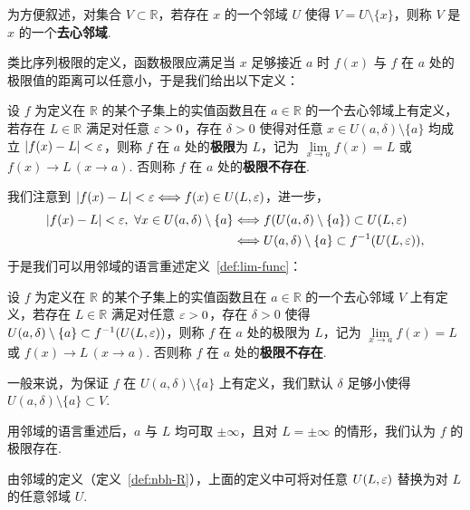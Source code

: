 \documentclass[../main.tex]{subfiles}
\begin{document}
为方便叙述，对集合 $V \subset \mathbb R$，若存在 $x$ 的一个邻域 $U$ 使得 $V = U \setminus \{x\}$，则称 $V$ 是 $x$ 的一个\textbf{去心邻域}. 

类比序列极限的定义，函数极限应满足当 $x$ 足够接近 $a$ 时 $f(x)$ 与 $f$ 在 $a$ 处的极限值的距离可以任意小，于是我们给出以下定义：

\begin{definition}[函数极限的算术化定义] \label{def:lim-func}
    设 $f$ 为定义在 $\mathbb R$ 的某个子集上的实值函数且在 $a \in \mathbb R$ 的一个去心邻域上有定义，若存在 $L \in \mathbb R$ 满足对任意 $\varepsilon > 0$，存在 $\delta > 0$ 使得对任意 $x \in U(a, \delta) \setminus \{a\}$ 均成立 $|f(x) - L| < \varepsilon$，则称 $f$ 在 $a$ 处的\textbf{极限}为 $L$，记为 $\lim\limits_{x \to a} f(x) = L$ 或 $f(x) \to L \,(x \to a)$. 否则称 $f$ 在 $a$ 处的\textbf{极限不存在}. 
\end{definition}

我们注意到 $|f(x) - L| < \varepsilon \Longleftrightarrow f(x) \in U(L, \varepsilon)$，进一步，
\begin{align*}
    |f(x) - L| < \varepsilon, \ \forall x \in U(a, \delta) \setminus \{a\} 
&\Longleftrightarrow f(U(a, \delta) \setminus \{a\}) \subset U(L, \varepsilon) \\
&\Longleftrightarrow U(a, \delta) \setminus \{a\} \subset f^{-1}(U(L, \varepsilon)), 
\end{align*}
于是我们可以用邻域的语言重述定义~\ref{def:lim-func}：

\begin{definition} \label{def:lim-func-nbh}
    设 $f$ 为定义在 $\mathbb R$ 的某个子集上的实值函数且在 $a \in \mathbb R$ 的一个去心邻域 $V$ 上有定义，若存在 $L \in \mathbb R$ 满足对任意 $\varepsilon > 0$，存在 $\delta > 0$ 使得 $U(a, \delta) \setminus \{a\} \subset f^{-1}(U(L, \varepsilon))$，则称 $f$ 在 $a$ 处的极限为 $L$，记为 $\lim\limits_{x \to a} f(x) = L$ 或 $f(x) \to L \,(x \to a)$. 否则称 $f$ 在 $a$ 处的\textbf{极限不存在}. 
\end{definition}

\begin{remark}
    一般来说，为保证 $f$ 在 $U(a, \delta) \setminus \{a\}$ 上有定义，我们默认 $\delta$ 足够小使得 $U(a, \delta) \setminus \{a\} \subset V$. 

    用邻域的语言重述后，$a$ 与 $L$ 均可取 $\pm \infty$，且对 $L = \pm \infty$ 的情形，我们认为 $f$ 的极限存在. 
    
    由邻域的定义（定义~\ref{def:nbh-R}），上面的定义中可将对任意 $U(L, \varepsilon)$ 替换为对 $L$ 的任意邻域 $U$. 
\end{remark}
\end{document}
